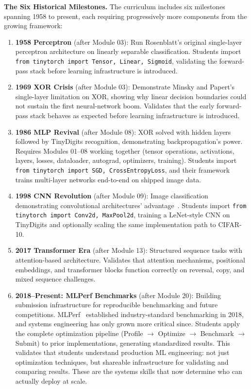 \documentclass[10pt,twocolumn]{article}
\begin{document}
\textbf{The Six Historical Milestones.} The curriculum includes six milestones spanning 1958 to present, each requiring progressively more components from the growing framework:

\begin{enumerate}
\item \textbf{1958 Perceptron} (after Module 03): Run Rosenblatt's original single-layer perceptron architecture on linearly separable classification. Students import \texttt{from tinytorch import Tensor, Linear, Sigmoid}, validating the forward-pass stack before learning infrastructure is introduced.

\item \textbf{1969 XOR Crisis} (after Module 03): Demonstrate Minsky and Papert's single-layer limitation on XOR, showing why linear decision boundaries could not sustain the first neural-network boom. Validates that the early forward-pass stack behaves as expected before learning infrastructure is introduced.

\item \textbf{1986 MLP Revival} (after Module 08): XOR solved with hidden layers followed by TinyDigits recognition, demonstrating backpropagation's power. Requires Modules 01--08 working together (tensor operations, activations, layers, losses, dataloader, autograd, optimizers, training). Students import \texttt{from tinytorch import SGD, CrossEntropyLoss}, and their framework trains multi-layer networks end-to-end on shipped image data.

\item \textbf{1998 CNN Revolution} (after Module 09): Image classification demonstrating convolutional architectures' advantage~\citep{krizhevsky2009cifar, lecun1998}. Students import \texttt{from tinytorch import Conv2d, MaxPool2d}, training a LeNet-style CNN on TinyDigits and optionally scaling the same implementation path to CIFAR-10.

\item \textbf{2017 Transformer Era} (after Module 13): Structured sequence tasks with attention-based architecture. Validates that attention mechanisms, positional embeddings, and transformer blocks function correctly on reversal, copy, and mixed sequence challenges.

\item \textbf{2018--Present: MLPerf Benchmarks} (after Module 20): Building submission infrastructure for reproducible benchmarking and future competitions. MLPerf~\citep{mattson2020mlperf, reddi2020} established industry-standard benchmarking in 2018, and systems engineering has only grown more critical since. Students apply the complete optimization pipeline (Profile $\rightarrow$ Optimize $\rightarrow$ Benchmark $\rightarrow$ Submit) to prior implementations, generating standardized results. This validates that students understand production ML engineering: not just optimization techniques, but shareable infrastructure for validating and comparing results. These are the systems skills that now determine who can actually deploy at scale.
\end{enumerate}
\end{document}
